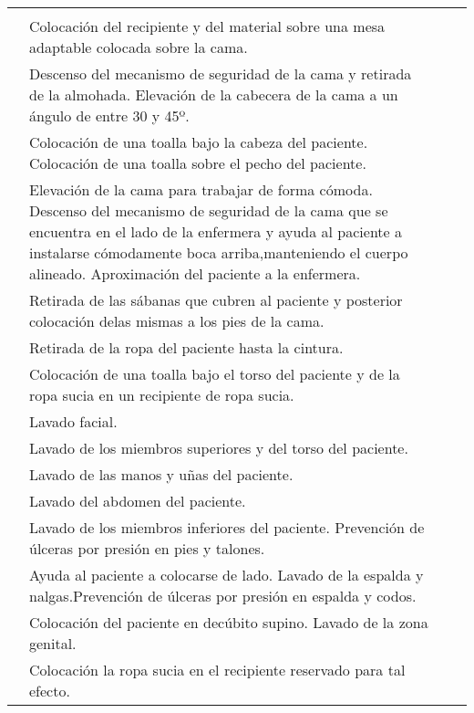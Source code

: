 \begin{landscape}
\begin{longtable}{N{0.15\textwidth}M{0.94\textwidth}|M{0.095\textwidth}M{0.22\textwidth}}
            & & \\  
            & Colocación del recipiente y del material sobre una mesa adaptable colocada sobre la cama.
            & & \\  
            & Descenso del mecanismo de seguridad de la cama y retirada de la almohada. Elevación de la cabecera de la cama a un ángulo de entre 30 y 45º.
            & & \\  
            & Colocación de una toalla bajo la cabeza del paciente. Colocación de una toalla sobre el pecho del paciente.
            & & \\  
            & Elevación de la cama para trabajar de forma cómoda. Descenso del mecanismo de seguridad de la cama que se encuentra en el lado de la enfermera y ayuda al paciente a instalarse cómodamente boca arriba,manteniendo el cuerpo alineado. Aproximación del paciente a la enfermera.
            & & \\  
            & Retirada de las sábanas que cubren al paciente y posterior colocación delas mismas a los pies de la cama.
            & & \\  
            & Retirada de la ropa del paciente hasta la cintura.
            & & \\  
            & Colocación de una toalla bajo el torso del paciente y de la ropa sucia en un recipiente de ropa sucia.
            & & \\  
            & Lavado facial.
            & & \\ 
            & Lavado de los miembros superiores y del torso del paciente.
            & & \\  
            & Lavado de las manos y uñas del paciente.
            & & \\  
            & Lavado del abdomen del paciente.
            & & \\  
            & Lavado de los miembros inferiores del paciente. Prevención de úlceras por presión en pies y talones.
            & & \\  
            & Ayuda al paciente a colocarse de lado. Lavado de la espalda y nalgas.Prevención de úlceras por presión en espalda y codos.
            & & \\  
            & Colocación del paciente en decúbito supino. Lavado de la zona genital.
            & & \\  
            & Colocación la ropa sucia en el recipiente reservado para tal efecto.

\end{longtable}
\end{landscape}
